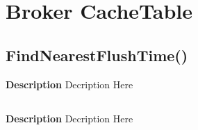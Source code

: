 \documentclass[letterpaper,12pt]{report}
\begin{document}
{
\chapter{Broker CacheTable}
}


{
\pagebreak
\section{FindNearestFlushTime()}
    \begin{description}
     \item \textbf{Description} 
	\newline \hspace*{1cm} Decription Here
    \end{description}

}

{
\pagebreak
\section{}
    \begin{description}
     \item \textbf{Description} 
	\newline \hspace*{1cm} Decription Here
    \end{description}

}
\end{document}
